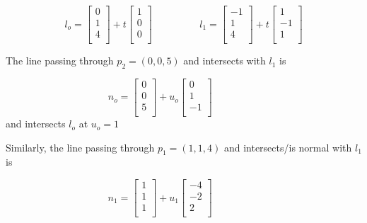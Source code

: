 \documentclass[a4paper,10pt]{scrartcl}
\begin{document}
\[ l_o = \begin{bmatrix}
          0 \\
          1 \\
          4 \\
         \end{bmatrix} + t
         \begin{bmatrix}
          1 \\
          0 \\
          0 \\
         \end{bmatrix} \hspace{2cm}
  l_1 = \begin{bmatrix}
	    -1 \\
	    1 \\
	    4 \\
	  \end{bmatrix} + t
	  \begin{bmatrix}
	    1 \\
	    -1 \\
	    1 \\
	  \end{bmatrix}
\]

The line passing through $p_2 = (0, 0, 5)$ and intersects with $l_1$ is

\[
  n_o = \begin{bmatrix}
          0 \\
          0 \\
          5 \\
         \end{bmatrix} + u_o
         \begin{bmatrix}
          0 \\
          1 \\
          -1 \\
         \end{bmatrix} \hspace{2cm}
\] and intersects $l_o$ at $u_o = 1$

Similarly, the line passing through $p_1 = (1, 1, 4)$ and intersects/is normal with $l_1$ is

\[
  n_1 = \begin{bmatrix}
          1 \\
          1 \\
          1 \\
         \end{bmatrix} + u_1
         \begin{bmatrix}
          -4 \\
          -2 \\
          2 \\
         \end{bmatrix} \hspace{2cm}
\]
\end{document}
